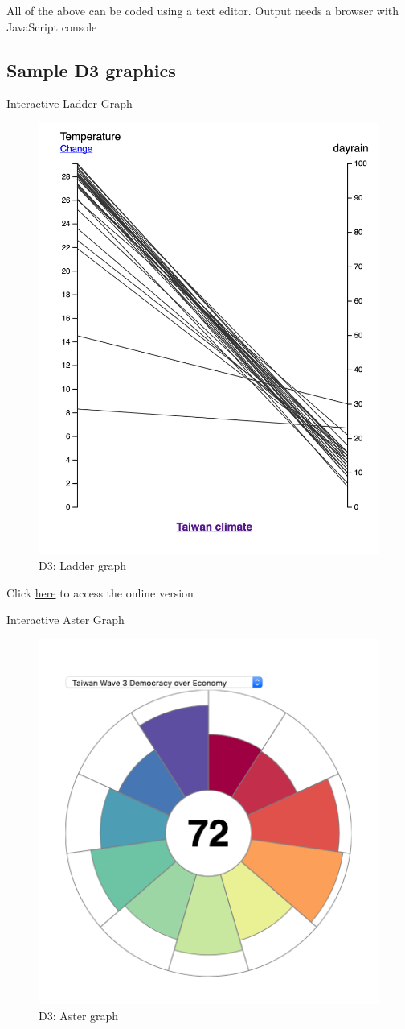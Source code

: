 \documentclass[]{book}
\begin{document}
All of the above can be coded using a text editor. Output needs a browser with JavaScript console

\hypertarget{sample-d3-graphics}{%
\subsection{Sample D3 graphics}\label{sample-d3-graphics}}

Interactive Ladder Graph

\begin{figure}
\includegraphics[width=0.5\linewidth]{laddergraph_twclimate} \caption{D3: Ladder graph}\label{fig:D3laddergraph}
\end{figure}

Click \href{https://karl-ho.github.io/D3/lg_twclimate/index.html}{here} to access the online version

Interactive Aster Graph

\begin{figure}
\includegraphics[width=0.5\linewidth]{astergraph_twhkdemocracy} \caption{D3: Aster graph}\label{fig:D3astergraph}
\end{figure}
\end{document}
